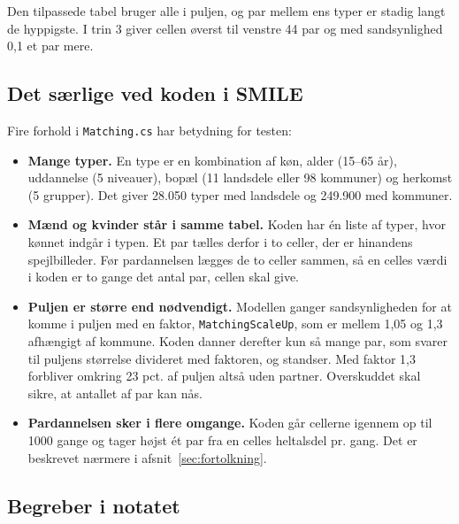\documentclass[11pt,a4paper]{article}
\newcommand{\kode}[1]{\texttt{#1}}
\begin{document}
Den tilpassede tabel bruger alle i puljen, og par mellem ens typer er stadig langt de hyppigste. I
trin 3 giver cellen øverst til venstre 44 par og med sandsynlighed 0,1 et par mere.

\subsection{Det særlige ved koden i SMILE}

Fire forhold i \kode{Matching.cs} har betydning for testen:

\begin{itemize}
\item \textbf{Mange typer.} En type er en kombination af køn, alder (15--65 år), uddannelse
(5 niveauer), bopæl (11 landsdele eller 98 kommuner) og herkomst (5 grupper). Det giver 28.050 typer
med landsdele og 249.900 med kommuner.

\item \textbf{Mænd og kvinder står i samme tabel.} Koden har én liste af typer, hvor kønnet indgår i
typen. Et par tælles derfor i to celler, der er hinandens spejlbilleder. Før pardannelsen lægges de
to celler sammen, så en celles værdi i koden er to gange det antal par, cellen skal give.

\item \textbf{Puljen er større end nødvendigt.} Modellen ganger sandsynligheden for at komme i puljen
med en faktor, \kode{MatchingScaleUp}, som er mellem 1,05 og 1,3 afhængigt af kommune. Koden danner
derefter kun så mange par, som svarer til puljens størrelse divideret med faktoren, og standser. Med
faktor 1,3 forbliver omkring 23 pct. af puljen altså uden partner. Overskuddet skal sikre, at
antallet af par kan nås.

\item \textbf{Pardannelsen sker i flere omgange.} Koden går cellerne igennem op til 1000 gange og
tager højst ét par fra en celles heltalsdel pr. gang. Det er beskrevet nærmere i
afsnit~\ref{sec:fortolkning}.
\end{itemize}

\subsection{Begreber i notatet}
\end{document}
